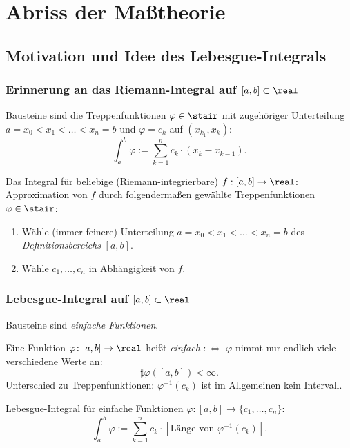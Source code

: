 \setcounter{section}{10}
\section{Abriss der Maßtheorie}
\subsection*{Motivation und Idee des Lebesgue-Integrals}
\subsubsection*{Erinnerung an das Riemann-Integral auf $[a,b] \subset \real$}
Bausteine sind die Treppenfunktionen $\varphi \in \stair$ mit zugehöriger Unterteilung $a = x_0 < x_1 < \ldots < x_n = b$ und $\varphi = c_k$ auf $(x_{k_1},x_k)$:
\[ \int_a^b \varphi := \sum_{k=1}^n c_k \cdot (x_k - x_{k-1}). \]

Das Integral für beliebige (Riemann-integrierbare) $f:[a,b]\to\real$: Approximation von $f$ durch folgendermaßen gewählte Treppenfunktionen $\varphi \in \stair$:
\begin{enumerate}
 \item Wähle (immer feinere) Unterteilung $a = x_0 < x_1 < \ldots < x_n = b$ des \emph{Definitionsbereichs} $[a,b]$.
 \item Wähle $c_1, \ldots, c_n$ in Abhängigkeit von $f$.
\end{enumerate}

\subsubsection*{Lebesgue-Integral auf $[a,b] \subset \real$}
Bausteine sind \emph{einfache Funktionen}.

Eine Funktion $\varphi\colon[a,b] \to \real$ heißt \emph{einfach} $:\Leftrightarrow$ $\varphi$ nimmt nur endlich viele verschiedene Werte an:
\[ \sharp \varphi([a,b]) < \infty. \]
Unterschied zu Treppenfunktionen: $\varphi^{-1}(c_k)$ ist im Allgemeinen kein Intervall.

Lebesgue-Integral für einfache Funktionen $\varphi:[a,b] \to \{ c_1, \ldots, c_n \}$:
\[ \int_a^b \varphi := \sum_{k=1}^n c_k \cdot [ \text{Länge von } \varphi^{-1}(c_k) ]. \]

